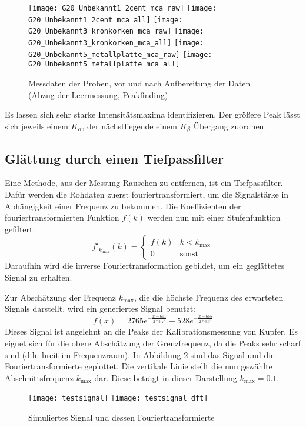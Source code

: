 \documentclass{../Misc/MontavonLaTeX/Montavon}
\newcommand{\halfwidth}{0.48\textwidth}
\begin{document}
\begin{figure}[h]
\centering
\texttt{[image: G20\_Unbekannt1\_2cent\_mca\_raw]}
\texttt{[image: G20\_Unbekannt1\_2cent\_mca\_all]}
\texttt{[image: G20\_Unbekannt3\_kronkorken\_mca\_raw]}
\texttt{[image: G20\_Unbekannt3\_kronkorken\_mca\_all]}
\texttt{[image: G20\_Unbekannt5\_metallplatte\_mca\_raw]}
\texttt{[image: G20\_Unbekannt5\_metallplatte\_mca\_all]}
\caption{Messdaten der Proben, vor und nach Aufbereitung der Daten (Abzug der Leermessung, Peakfinding)}
\label{fig:Unbekannte}
\end{figure}


Es lassen sich sehr starke Intensitätsmaxima identifizieren. Der größere
Peak lässt sich jeweils einem $K_{\alpha}$, der nächstliegende einem
$K_{\beta}$ Übergang zuordnen.


\subsection{Glättung durch einen Tiefpassfilter}
Eine Methode, aus der Messung Rauschen zu entfernen, ist ein Tiefpassfilter. Dafür werden die Rohdaten zuerst fouriertransformiert, um die Signalstärke in Abhängigkeit einer Frequenz zu bekommen.
Die Koeffizienten der fouriertransformierten Funktion $f(k)$ werden nun mit einer Stufenfunktion gefiltert:
\[
	f'_{k_\textrm{max}}(k) = \begin{cases} f(k) & k < k_\textrm{max} \\ 0 & \textrm{sonst} \end{cases}
\]
Daraufhin wird die inverse Fouriertransformation gebildet, um ein geglättetes Signal zu erhalten.

Zur Abschätzung der Frequenz $k_\textrm{max}$, die die höchste Frequenz des erwarteten Signals darstellt, wird ein generiertes Signal benutzt:
\[
	f(x) = 2765 e^{-\frac{x - 601}{2 * 5.7^2}} + 528 e^{-\frac{x - 665}{2 * 6.0^2}}
\]
Dieses Signal ist angelehnt an die Peaks der Kalibrationsmessung von Kupfer. Es eignet sich für die obere Abschätzung der Grenzfrequenz, da die Peaks sehr scharf sind (d.h. breit im Frequenzraum).
In Abbildung \ref{fig:Fourier} sind das Signal und die Fouriertransformierte geplottet. Die vertikale Linie stellt die nun gewählte Abschnittsfrequenz $k_\textrm{max}$ dar. Diese beträgt in dieser Darstellung $k_\textrm{max} = 0.1$.

\begin{figure}[h]
\texttt{[image: testsignal]}
\texttt{[image: testsignal\_dft]}
\caption{Simuliertes Signal und dessen Fouriertransformierte}
\label{fig:Fourier}
\end{figure}
\end{document}
